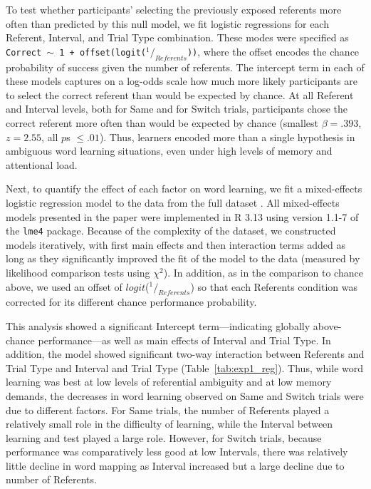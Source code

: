 \documentclass[authoryear,review]{elsarticle}
\begin{document}
To test whether participants' selecting the previously exposed referents more often than predicted by this null model, we fit logistic regressions for each Referent, Interval, and Trial Type combination. These modes were specified as {\small \tt{Correct $\sim$ 1 + offset(logit($^1/_{Referents}$))}}, where the offset encodes the chance probability of success given the number of referents. The intercept term in each of these models captures on a log-odds scale how much more likely participants are to select the correct referent than would be expected by chance. At all Referent and Interval levels, both for Same and for Switch trials, participants chose the correct referent more often than would be expected by chance (smallest $\beta =  .393$, $z=2.55$, all $p$s $\leq .01$). Thus, learners encoded more than a single hypothesis in ambiguous word learning situations, even under high levels of memory and attentional load. 

Next, to quantify the effect of each factor on word learning, we fit a mixed-effects logistic regression model to the data from the full dataset \citep{Baayen2008}. All mixed-effects models presented in the paper were implemented in R 3.13 using version 1.1-7 of the \texttt{lme4} package. Because of the complexity of the dataset, we constructed models iteratively, with first main effects and then interaction terms added as long as they significantly improved the fit of the model to the data (measured by likelihood comparison tests using $\chi^2$). In addition, as in the comparison to chance above, we used an offset of $logit$($^1/_{Referents}$) so that each Referents condition was corrected for its different chance performance probability. 

This analysis showed a significant Intercept term---indicating globally above-chance performance---as well as main effects of Interval and Trial Type. In addition, the model showed significant two-way interaction between Referents and Trial Type and Interval and Trial Type (Table~\ref{tab:exp1_reg}). Thus, while word learning was best at low levels of referential ambiguity and at low memory demands, the decreases in word learning observed on Same and Switch trials were due to different factors. For Same trials, the number of Referents played a relatively small role in the difficulty of learning, while the Interval between learning and test played a large role. However, for Switch trials, because performance was comparatively less good at low Intervals, there was relatively little decline in word mapping as Interval increased but a large decline due to number of Referents. 
\end{document}
